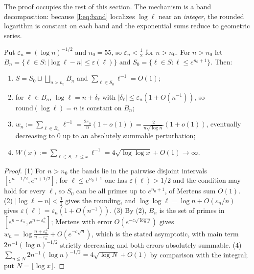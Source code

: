 The proof occupies the rest of this section. The mechanism is a band decomposition: because
\eqref{I:eq:band} localizes $\log\ell$ near an \emph{integer}, the rounded logarithm is
constant on each band and the exponential sums reduce to geometric series.

\begin{lemma}[Bands]\label{I:lem:bands}
Put $\varepsilon_n=(\log n)^{-1/2}$ and $n_0=55$, so $\varepsilon_n<\tfrac12$ for $n>n_0$.
For $n>n_0$ let $B_n=\{\ell\in S:|\log\ell-n|\le\varepsilon(\ell)\}$ and
$S_0=\{\ell\in S:\ell\le e^{n_0+1}\}$. Then:
\begin{enumerate}
\item $S=S_0\sqcup\bigsqcup_{n>n_0}B_n$ and $\sum_{\ell\in S_0}\ell^{-1}=O(1)$;
\item for $\ell\in B_n$, $\log\ell=n+\delta_\ell$ with $|\delta_\ell|\le\varepsilon_n(1+O(n^{-1}))$,
so $\mathrm{round}(\log\ell)=n$ is constant on $B_n$;
\item $w_n:=\sum_{\ell\in B_n}\ell^{-1}=\frac{2\varepsilon_n}{n}(1+o(1))=\frac{2}{n\sqrt{\log n}}(1+o(1))$,
eventually decreasing to $0$ up to an absolutely summable perturbation;
\item $W(x):=\sum_{\ell\in S,\ \ell\le x}\ell^{-1}=4\sqrt{\log\log x}+O(1)\to\infty$.
\end{enumerate}
\end{lemma}

\begin{proof}
(1) For $n>n_0$ the bands lie in the pairwise disjoint intervals $[e^{n-1/2},e^{n+1/2}]$;
for $\ell\le e^{n_0+1}$ one has $\varepsilon(\ell)>1/2$ and the condition may hold for every
$\ell$, so $S_0$ can be all primes up to $e^{n_0+1}$, of Mertens sum $O(1)$.
(2) $|\log\ell-n|<\tfrac12$ gives the rounding, and
$\log\log\ell=\log n+O(\varepsilon_n/n)$ gives $\varepsilon(\ell)=\varepsilon_n(1+O(n^{-1}))$.
(3) By (2), $B_n$ is the set of primes in $[e^{n-\varepsilon_n^-},e^{n+\varepsilon_n^+}]$;
Mertens with error $O(e^{-c\sqrt{\log y}})$ gives
$w_n=\log\frac{n+\varepsilon_n^+}{n-\varepsilon_n^-}+O(e^{-c\sqrt n})$, which is the stated
asymptotic, with main term $2n^{-1}(\log n)^{-1/2}$ strictly decreasing and both errors
absolutely summable.
(4) $\sum_{n\le N}2n^{-1}(\log n)^{-1/2}=4\sqrt{\log N}+O(1)$ by comparison with the
integral; put $N=\lfloor\log x\rfloor$.
\end{proof}


